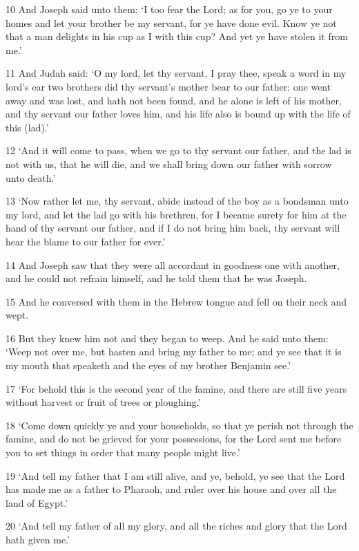 \par 10 And Joseph said unto them: ‘I too fear the Lord; as for you, go ye to your homes and let your brother be my servant, for ye have done evil. Know ye not that a man delights in his cup as I with this cup? And yet ye have stolen it from me.’
\par 11 And Judah said: ‘O my lord, let thy servant, I pray thee, speak a word in my lord's ear two brothers did thy servant's mother bear to our father: one went away and was lost, and hath not been found, and he alone is left of his mother, and thy servant our father loves him, and his life also is bound up with the life of this (lad).’
\par 12 ‘And it will come to pass, when we go to thy servant our father, and the lad is not with us, that he will die, and we shall bring down our father with sorrow unto death.’
\par 13 ‘Now rather let me, thy servant, abide instead of the boy as a bondsman unto my lord, and let the lad go with his brethren, for I became surety for him at the hand of thy servant our father, and if I do not bring him back, thy servant will hear the blame to our father for ever.’
\par 14 And Joseph saw that they were all accordant in goodness one with another, and he could not refrain himself, and he told them that he was Joseph.
\par 15 And he conversed with them in the Hebrew tongue and fell on their neck and wept.
\par 16 But they knew him not and they began to weep. And he said unto them: ‘Weep not over me, but hasten and bring my father to me; and ye see that it is my mouth that speaketh and the eyes of my brother Benjamin see.’
\par 17 ‘For behold this is the second year of the famine, and there are still five years without harvest or fruit of trees or ploughing.’
\par 18 ‘Come down quickly ye and your households, so that ye perish not through the famine, and do not be grieved for your possessions, for the Lord sent me before you to set things in order that many people might live.’
\par 19 ‘And tell my father that I am still alive, and ye, behold, ye see that the Lord has made me as a father to Pharaoh, and ruler over his house and over all the land of Egypt.’
\par 20 ‘And tell my father of all my glory, and all the riches and glory that the Lord hath given me.’
